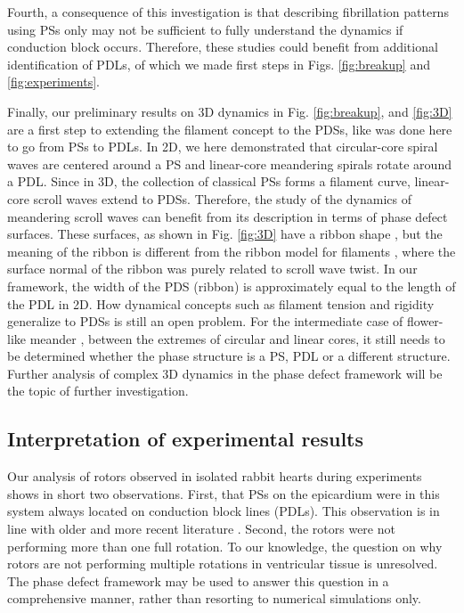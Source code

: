 \documentclass[aps,pre,amsfonts,amssymb,amsmath,twocolumn, superscriptaddress]{revtex4-1}
\begin{document}
Fourth, a consequence of this investigation is that describing fibrillation patterns using PSs only \citep{Gray:1995,Gurevich:2019} may not be sufficient to fully understand the dynamics if conduction block occurs. Therefore, these studies could benefit from additional identification of PDLs, of which we made first steps in Figs. \ref{fig:breakup} and \ref{fig:experiments}. 

Finally, our preliminary results on 3D dynamics in Fig. \ref{fig:breakup}, and \ref{fig:3D} are a first step to extending the filament concept to the PDSs, like was done here to go from PSs to  PDLs. In 2D, we here demonstrated that circular-core spiral waves are centered around a PS and linear-core meandering spirals rotate around a PDL. Since in 3D, the collection of classical PSs forms a filament curve, linear-core scroll waves extend to PDSs. Therefore, the study of the dynamics of meandering scroll waves can benefit from its description in terms of phase defect surfaces. These surfaces, as shown in Fig. \ref{fig:3D} have a ribbon shape \citep{Efimov:1999}, but the meaning of the ribbon is different from the ribbon model for filaments \citep{Echebarria:2006}, where the surface normal of the ribbon was purely related to scroll wave twist. In our framework, the width of the PDS (ribbon) is approximately equal to the length of the PDL in 2D. How dynamical concepts such as filament tension \citep{Biktashev:1994} and rigidity \citep{Dierckx:2012} generalize to PDSs is still an open problem. For the intermediate case of flower-like meander \citep{Barkley:1990b}, between the extremes of circular and linear cores, it still needs to be determined whether the phase structure  is a PS, PDL or a different structure. Further analysis of complex 3D dynamics in the phase defect framework will be the topic of further investigation.

\subsection{Interpretation of experimental results}

Our analysis of rotors observed in isolated rabbit hearts during experiments shows in short two observations. First, that PSs on the epicardium were in this system always located on conduction block lines (PDLs). This observation is in line with older and more recent literature \citep{Efimov:1999,Podziemski:2018}. Second, the rotors were not performing more than one full rotation. To our knowledge, the question on why rotors are not performing multiple rotations in ventricular tissue is unresolved. The phase defect framework may be used to answer this question in a comprehensive manner, rather than resorting to numerical simulations only. 
\end{document}
